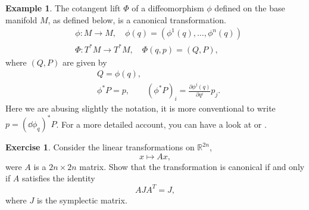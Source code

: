 \documentclass[english,fontsize=11pt,paper=b5]{scrbook}
\numberwithin{equation}{chapter}
\theoremstyle{definition}
\newtheorem{example}{Example}[chapter]
\newtheorem{exercise}{Exercise}[chapter]
\begin{document}
    \begin{example}\label{ex:hamlift1}
      The cotangent lift $\Phi$ of a diffeomorphism $\phi$ defined on the base manifold $M$, as defined below, is a canonical transformation.
      \begin{align}
     & \phi:M\to M, \quad \phi(q) = \left(\phi^1(q), \ldots, \phi^n(q)\right) \\
     & \Phi:T^*M\to T^*M, \quad \Phi(q,p) = (Q, P),
      \end{align}
      where $(Q,P)$ are given by
      \begin{align}
     & Q = \phi(q),                                                                     \\
     & \phi^* P = p, \qquad (\phi^* P)_i = \frac{\partial \phi^j(q)}{\partial q^i} p_j.
      \end{align}
      Here we are abusing slightly the notation, it is more conventional to write $p = (\dd\phi_{q})^* P$.
      For a more detailed account, you can have a look at \cite[Chapter 6.3 and in particular formula (6.3.4)]{book:marsdenratiu} or \cite[Proposition 6.2.8]{lectures:aom:seri}.
    \end{example}

    \begin{exercise}
      Consider the linear transformations on $\mathbb{R}^{2n}$,
      \begin{equation}
        x \mapsto A x,
      \end{equation}
      were $A$ is a $2n\times2n$ matrix.
      Show that the transformation is canonical if and only if $A$ satisfies the identity
      \begin{equation}
        A J A^T = J,
      \end{equation}
      where $J$ is the symplectic matrix.
    \end{exercise}
\end{document}
